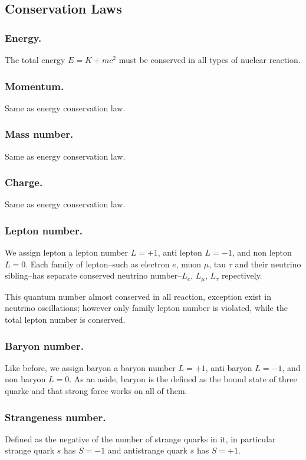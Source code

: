 \documentclass[../../../main.tex]{subfiles}
\begin{document}
\subsection*{Conservation Laws}
\subsubsection*{Energy.} The total energy $E=K+mc^2$ must be conserved in all types of nuclear reaction.

\subsubsection*{Momentum.} Same as energy conservation law.

\subsubsection*{Mass number.} Same as energy conservation law.

\subsubsection*{Charge.} Same as energy conservation law.

\subsubsection*{Lepton number.} We assign lepton a lepton number $L=+1$, anti lepton $L=-1$, and non lepton $L=0$. Each family of lepton--such as electron $e$, muon $\mu$, tau $\tau$ and their neutrino sibling--has separate conserved neutrino number--$L_e$, $L_\mu$, $L_\tau$ repectively.

This quantum number almost conserved in all reaction, exception exist in neutrino oscillations; however only family lepton number is violated, while the total lepton number is conserved.

\subsubsection*{Baryon number.} Like before, we assign baryon a baryon number $L=+1$, anti baryon $L=-1$, and non baryon $L=0$. As an aside, baryon is the defined as the bound state of three quarke and that strong force works on all of them.

\subsubsection*{Strangeness number.} Defined as the negative of the number of strange quarks in it, in particular strange quark $s$ has $S=-1$ and antistrange quark $\bar{s}$ has $S=+1$.
\end{document}

